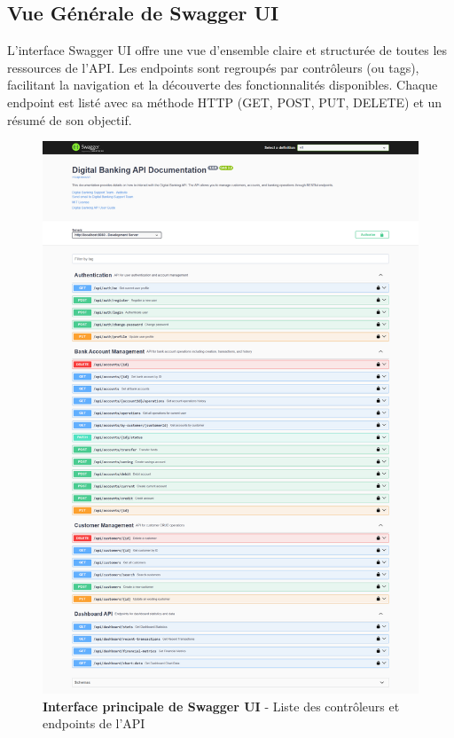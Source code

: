 \documentclass[10pt]{article}
\begin{document}
\subsection{Vue Générale de Swagger UI}
L'interface Swagger UI offre une vue d'ensemble claire et structurée de toutes les ressources de l'API. Les endpoints sont regroupés par contrôleurs (ou tags), facilitant la navigation et la découverte des fonctionnalités disponibles. Chaque endpoint est listé avec sa méthode HTTP (GET, POST, PUT, DELETE) et un résumé de son objectif.

\begin{figure}[H]
    \centering
    \begin{tcolorbox}[
        width=0.9\textwidth,
        colback=white,
        colframe=secondarygreen, 
        boxrule=1pt,
        arc=5pt,
        boxsep=5pt
    ]
        \includegraphics[width=\textwidth]{screenshots/swagger_ui_main.png} 
    \end{tcolorbox}
    \caption{\textbf{Interface principale de Swagger UI} - Liste des contrôleurs et endpoints de l'API}
    \label{fig:swagger_ui_main}
\end{figure}
\end{document}
